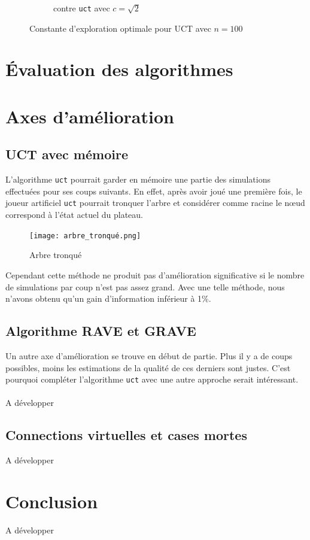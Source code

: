 \documentclass[a4paper]{article}
\theoremstyle{definition}
\begin{document}
\begin{figure}[!h]
\begin{subfigure}{0.5\textwidth}
		\caption{contre \texttt{uct} avec $c = \sqrt{2}$}
		\label{fig:3_}
	\end{subfigure}
	\caption{Constante d'exploration optimale pour UCT avec $n=100$}
	\label{fig:best-cst}
\end{figure}

\newpage

\section{Évaluation des algorithmes}


\newpage

\section{Axes d'amélioration}

\subsection{UCT avec mémoire}

L'algorithme \texttt{uct} pourrait garder en mémoire une partie des simulations effectuées pour ses coups suivants. En effet, après avoir joué une première fois, le joueur artificiel \texttt{uct} pourrait tronquer l'arbre et considérer comme racine le nœud correspond à l'état actuel du plateau.\\

\begin{figure}[h]
	\centering
	\texttt{[image: arbre\_tronqué.png]}
	\caption{Arbre tronqué}
	\label{fig:arbre-tronqué}
\end{figure}

Cependant cette méthode ne produit pas d'amélioration significative si le nombre de simulations par coup n'est pas assez grand. Avec une telle méthode, nous n'avons obtenu qu'un gain d'information inférieur à 1\%.



\subsection{Algorithme RAVE et GRAVE}

Un autre axe d'amélioration se trouve en début de partie. Plus il y a de coups possibles, moins les estimations de la qualité de ces derniers sont justes. C'est pourquoi compléter l'algorithme \texttt{uct} avec une autre approche serait intéressant.\\
\\
A développer

\subsection{Connections virtuelles et cases mortes}

A développer
\newpage

\section{Conclusion}

A développer

\newpage

\listoffigures 

\newpage
\end{document}
